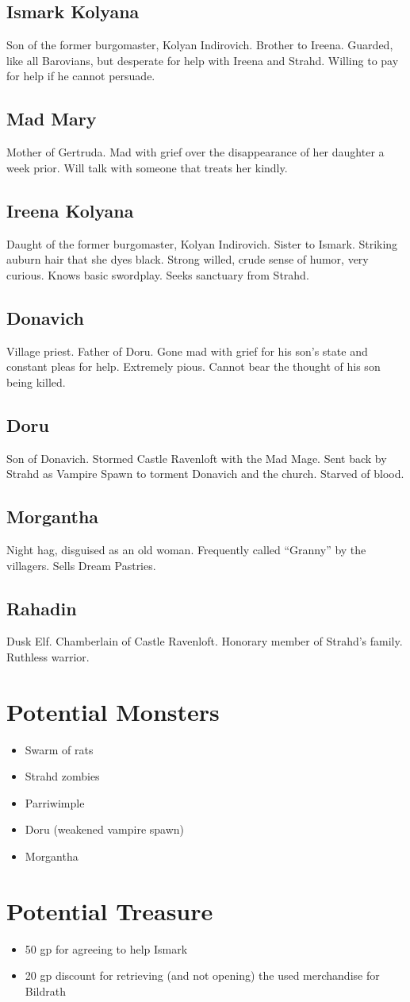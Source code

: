 \documentclass[a4paper,11pt]{article}
\begin{document}
\subsection{Ismark Kolyana}
  Son of the former burgomaster, Kolyan Indirovich. Brother to Ireena. Guarded, like all Barovians, but 
  desperate for help with Ireena and Strahd. Willing to pay for help if he cannot persuade.
\subsection{Mad Mary}
  Mother of Gertruda. Mad with grief over the disappearance of her daughter a week prior. Will talk with someone
  that treats her kindly.
\subsection{Ireena Kolyana}
  Daught of the former burgomaster, Kolyan Indirovich. Sister to Ismark. Striking auburn hair that she dyes 
  black. Strong willed, crude sense of humor, very curious. Knows basic swordplay. Seeks sanctuary from Strahd.
\subsection{Donavich}
  Village priest. Father of Doru. Gone mad with grief for his son's state and constant pleas for help. Extremely
  pious. Cannot bear the thought of his son being killed.
\subsection{Doru}
  Son of Donavich. Stormed Castle Ravenloft with the Mad Mage. Sent back by Strahd as Vampire Spawn to torment
  Donavich and the church. Starved of blood.
\subsection{Morgantha}
  Night hag, disguised as an old woman. Frequently called ``Granny'' by the villagers. Sells Dream Pastries.
\subsection{Rahadin}
  Dusk Elf. Chamberlain of Castle Ravenloft. Honorary member of Strahd's family. Ruthless warrior.


\section{Potential Monsters}
\label{sec:PotentialMonsters}
\begin{itemize}
  \item Swarm of rats
  \item Strahd zombies
  \item Parriwimple
  \item Doru (weakened vampire spawn)
  \item Morgantha
\end{itemize}


\section{Potential Treasure}
\label{sec:PotentialTreasure}
\begin{itemize}
  \item 50 gp for agreeing to help Ismark
  \item 20 gp discount for retrieving (and not opening) the used merchandise for Bildrath
\end{itemize}
\end{document}
